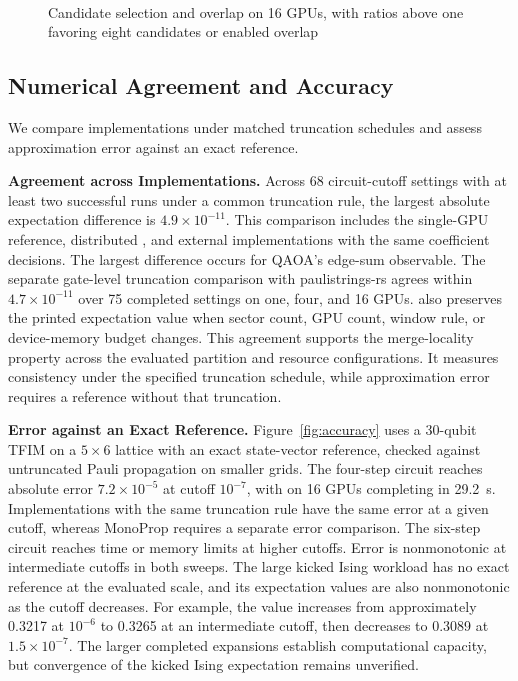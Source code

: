 \begin{figure}[t]
\centering
{}\\[-2pt]
\hfill
{}\hfill
{}
\caption{Candidate selection and overlap on 16 GPUs, with ratios above one favoring eight candidates or enabled overlap}
\label{fig:resector-ablation}
\end{figure}

\subsection{Numerical Agreement and Accuracy}
\label{sec:accuracy}
We compare implementations under matched truncation schedules and assess approximation error against an exact reference.

\noindent\textbf{Agreement across Implementations.}
Across 68 circuit-cutoff settings with at least two successful runs under a common truncation rule, the largest absolute expectation difference is $4.9\times10^{-11}$.
This comparison includes the single-GPU reference, distributed \cuPP, and external implementations with the same coefficient decisions.
The largest difference occurs for QAOA's edge-sum observable.
The separate gate-level truncation comparison with paulistrings-rs agrees within $4.7\times10^{-11}$ over 75 completed settings on one, four, and 16 GPUs.
\SectorQ also preserves the printed expectation value when sector count, GPU count, window rule, or device-memory budget changes.
This agreement supports the merge-locality property across the evaluated partition and resource configurations.
It measures consistency under the specified truncation schedule, while approximation error requires a reference without that truncation.

\noindent\textbf{Error against an Exact Reference.}
Figure~\ref{fig:accuracy} uses a 30-qubit TFIM on a $5\times6$ lattice with an exact state-vector reference, checked against untruncated Pauli propagation on smaller grids.
The four-step circuit reaches absolute error $7.2\times10^{-5}$ at cutoff $10^{-7}$, with \SectorQ on 16 GPUs completing in 29.2~s.
Implementations with the same truncation rule have the same error at a given cutoff, whereas MonoProp requires a separate error comparison.
The six-step circuit reaches time or memory limits at higher cutoffs.
Error is nonmonotonic at intermediate cutoffs in both sweeps.
The large kicked Ising workload has no exact reference at the evaluated scale, and its expectation values are also nonmonotonic as the cutoff decreases.
For example, the value increases from approximately 0.3217 at $10^{-6}$ to 0.3265 at an intermediate cutoff, then decreases to 0.3089 at $1.5\times10^{-7}$.
The larger completed expansions establish computational capacity, but convergence of the kicked Ising expectation remains unverified.

